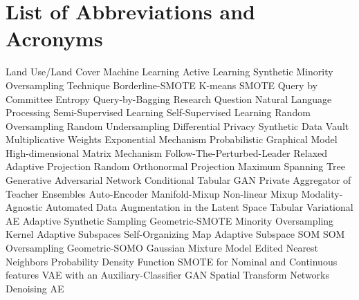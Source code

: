 {\chapter*{List of Abbreviations and Acronyms}
{
\begin{acronym}
             {Land Use/Land Cover}
               {Machine Learning}
               {Active Learning}
            {Synthetic Minority Oversampling Technique}
          {Borderline-SMOTE}
          {K-means SMOTE}
              {Query by Committee}
              {Entropy Query-by-Bagging}
               {Research Question}
              {Natural Language Processing}
          {Semi-Supervised Learning}
          {Self-Supervised Learning}
              {Random Oversampling}
              {Random Undersampling}
               {Differential Privacy}
              {Synthetic Data Vault}
             {Multiplicative Weights Exponential Mechanism}
              {Probabilistic Graphical Model}
             {High-dimensional Matrix Mechanism}
             {Follow-The-Perturbed-Leader}
              {Relaxed Adaptive Projection}
              {Random Orthonormal Projection}
              {Maximum Spanning Tree}
              {Generative Adversarial Network}
            {Conditional Tabular GAN}
             {Private Aggregator of Teacher Ensembles}
               {Auto-Encoder}
          {Manifold-Mixup}
         {Non-linear Mixup}
           {Modality-Agnostic Automated Data Augmentation in the
                        Latent Space}
             {Tabular Variational AE}
           {Adaptive Synthetic Sampling}
          {Geometric-SMOTE}
            {Minority Oversampling Kernel Adaptive Subspaces}
              {Self-Organizing Map}
            {Adaptive Subspace SOM}
             {SOM Oversampling}
           {Geometric-SOMO}
              {Gaussian Mixture Model}
              {Edited Nearest Neighbors}
              {Probability Density Function}
          {SMOTE for Nominal and Continuous features}
         {VAE with an Auxiliary-Classifier GAN}
              {Spatial Transform Networks}
              {Denoising AE}

\end{acronym}}}
